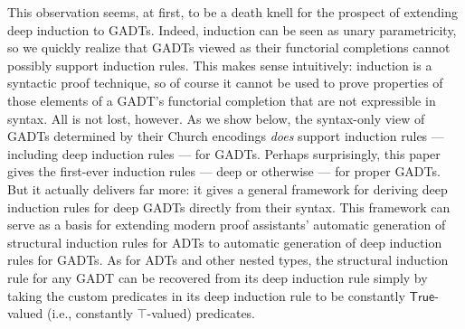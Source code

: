 \documentclass[9pt]{entcs}
\begin{document}
This observation seems, at first, to be a death knell for the prospect
of extending deep induction to GADTs. Indeed, induction can be seen as
unary parametricity, so we quickly realize that GADTs viewed as their
functorial completions cannot possibly support induction rules.  This
makes sense intuitively: induction is a syntactic proof technique, so
of course it cannot be used to prove properties of those elements of a
GADT's functorial completion that are not expressible in syntax. All
is not lost, however. As we show below, the syntax-only view of GADTs
determined by their Church encodings {\em does} support induction
rules --- including deep induction rules --- for GADTs. Perhaps
surprisingly, this paper gives the first-ever induction rules --- deep
or otherwise --- for proper GADTs. But it actually delivers far more:
it gives a general framework for deriving deep induction rules for
deep GADTs directly from their syntax. This framework can serve as a
basis for extending modern proof assistants' automatic generation of
structural induction rules for ADTs to automatic generation of deep
induction rules for GADTs. As for ADTs and other nested types, the
structural induction rule for any GADT can be recovered from its deep
induction rule simply by taking the custom predicates in its deep
induction rule to be constantly $\mathsf{True}$-valued (i.e.,
constantly $\mathsf{\top}$-valued) predicates.
\end{document}
